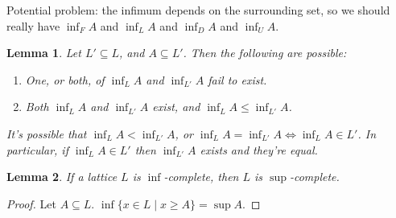 \documentclass[a4paper, 11pt]{article}
\newtheorem{lemma}{Lemma}
\begin{document}
Potential problem: the infimum depends on the surrounding set, so we should really have $\inf_F A$ and $\inf_L A$ and $\inf_D A$ and $\inf_U A$.

\begin{lemma}
  Let $L' \subseteq L$, and $A \subseteq L'$. Then the following are possible:

  \begin{enumerate}
    \item One, or both, of $\inf_L A$ and $\inf_{L'} A$ fail to exist.
    \item Both $\inf_L A$ and $\inf_{L'} A$ exist, and $\inf_L A \leq \inf_{L'} A$.
  \end{enumerate}

  It's possible that $\inf_L A < \inf_{L'} A$, or $\inf_L A = \inf_{L'} A \iff \inf_L A \in L'$. In particular, if $\inf_L A \in L'$ then $\inf_{L'} A$ exists and they're equal.
\end{lemma}

\begin{lemma}
  If a lattice $L$ is $\inf$-complete, then $L$ is $\sup$-complete.
\end{lemma}
\begin{proof}
  Let $A \subseteq L$. $\inf \{ x \in L \mid x \geq A \} = \sup A$.
\end{proof}
\end{document}
